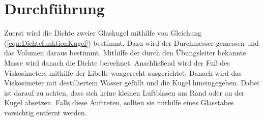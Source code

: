 \section{Durchführung}
Zuerst wird die Dichte zweier Glaskugel mithilfe von Gleichung (\ref{eqn:DichtefunktionKugel}) bestimmt. 
Dazu wird der Durchmesser gemessen und das Volumen daraus bestimmt. Mithilfe der durch den Übungsleiter 
bekannte Masse wird danach die Dichte berechnet. 
Anschließend wird der Fuß des Viskosimeters mithilfe der Libelle waagerecht ausgerichtet. 
Danach wird das Viskosimeter mit destilliertem Wasser gefüllt und die Kugel hineingegeben. 
Dabei ist darauf zu achten, dass sich keine kleinen Luftblasen am Rand oder an der Kugel absetzen. 
Falls diese Auftreten, sollten sie mithilfe eines Glasstabes vorsichtig entfernt werden. 
\label{sec:Durchführung}